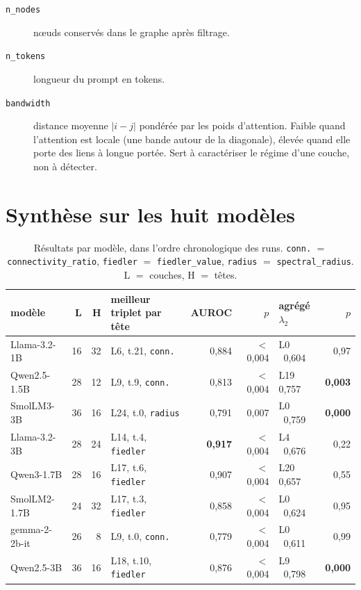 \documentclass[11pt,a4paper]{article}
\begin{document}
\begin{description}
\item[\texttt{n\_nodes}] n\oe uds conservés dans le graphe après filtrage.
\item[\texttt{n\_tokens}] longueur du prompt en tokens.
\item[\texttt{bandwidth}] distance moyenne $|i-j|$ pondérée par les poids
  d'attention. Faible quand l'attention est locale (une bande autour de la
  diagonale), élevée quand elle porte des liens à longue portée. Sert à
  caractériser le régime d'une couche, non à détecter.
\end{description}

\section{Synthèse sur les huit modèles}
\label{sec:synthese}

\begin{table}[htbp]\centering\small
\begin{tabular}{lrrlrrlr}
\hline
modèle & L & H & meilleur triplet par tête & AUROC & $p$ & agrégé $\lambda_2$ & $p$ \\
\hline
Llama-3.2-1B  & 16 & 32 & L6, t.21, \texttt{conn.}   & 0,884 & $<$0,004 & L0 \ 0,604 & 0,97 \\
Qwen2.5-1.5B  & 28 & 12 & L9, t.9, \texttt{conn.}    & 0,813 & $<$0,004 & L19 0,757 & \textbf{0,003} \\
SmolLM3-3B    & 36 & 16 & L24, t.0, \texttt{radius}  & 0,791 & 0,007    & L0 \ 0,759 & \textbf{0,000} \\
Llama-3.2-3B  & 28 & 24 & L14, t.4, \texttt{fiedler} & \textbf{0,917} & $<$0,004 & L4 \ 0,676 & 0,22 \\
Qwen3-1.7B    & 28 & 16 & L17, t.6, \texttt{fiedler} & 0,907 & $<$0,004 & L20 0,657 & 0,55 \\
SmolLM2-1.7B  & 24 & 32 & L17, t.3, \texttt{fiedler} & 0,858 & $<$0,004 & L0 \ 0,624 & 0,95 \\
gemma-2-2b-it & 26 &  8 & L9, t.0, \texttt{conn.}    & 0,779 & $<$0,004 & L0 \ 0,611 & 0,99 \\
Qwen2.5-3B    & 36 & 16 & L18, t.10, \texttt{fiedler}& 0,876 & $<$0,004 & L9 \ 0,798 & \textbf{0,000} \\
\hline
\end{tabular}
\caption{Résultats par modèle, dans l'ordre chronologique des runs.
\texttt{conn.} $=$ \texttt{connectivity\_ratio}, \texttt{fiedler} $=$
\texttt{fiedler\_value}, \texttt{radius} $=$ \texttt{spectral\_radius}.
L $=$ couches, H $=$ têtes.}
\label{tab:synthese}
\end{table}
\end{document}
